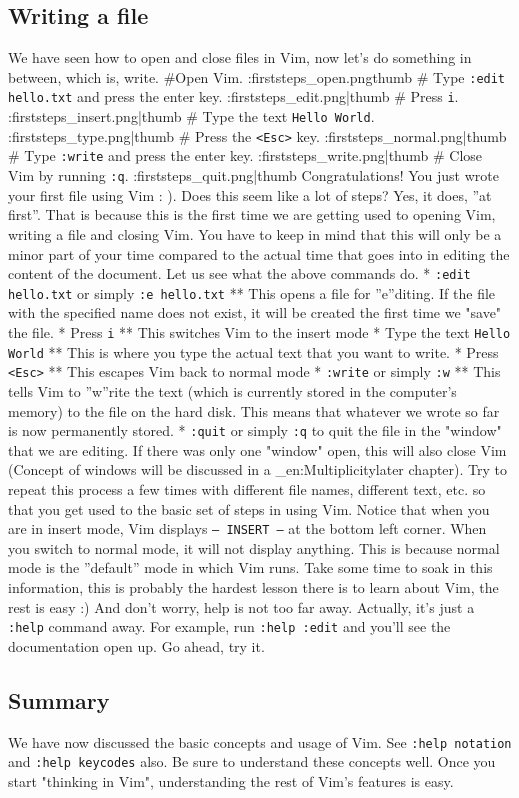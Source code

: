 \subsection{Writing a file} 
We have seen how to open and close files in Vim,
now let's do something in between, which is, write. 
\#Open Vim.  :firststeps\_open.pngthumb \# Type \texttt{:edit hello.txt} and press the enter
key. :firststeps\_edit.png|thumb \# Press \texttt{i}.
:firststeps\_insert.png|thumb \# Type the text \texttt{Hello World}.
:firststeps\_type.png|thumb \# Press the \texttt{<Esc>} key.
:firststeps\_normal.png|thumb \# Type \texttt{:write} and press the enter key.
:firststeps\_write.png|thumb \# Close Vim by running \texttt{:q}.
:firststeps\_quit.png|thumb Congratulations! You just wrote your first file
using Vim : ). Does this seem like a lot of steps? Yes, it does, ''at
first''. That is because this is the first time we are getting used to opening
Vim, writing a file and closing Vim. You have to keep in mind that this will
only be a minor part of your time compared to the actual time that goes into in
editing the content of the document. Let us see what the above commands do. *
\texttt{:edit hello.txt} or simply \texttt{:e hello.txt} ** This opens a file
for ''e''diting. If the file with the specified name does not exist, it will be
created the first time we "save" the file. * Press \texttt{i} ** This switches
Vim to the insert mode * Type the text \texttt{Hello World} ** This is where
you type the actual text that you want to write. * Press \texttt{<Esc>}
** This escapes Vim back to normal mode * \texttt{:write} or simply \texttt{:w}
** This tells Vim to ''w''rite the text (which is currently stored in the
computer's memory) to the file on the hard disk. This means that whatever we
wrote so far is now permanently stored. * \texttt{:quit} or simply \texttt{:q}
to quit the file in the "window" that we are editing. If there was only one
"window" open, this will also close Vim (Concept of windows will be discussed
in a \_en:Multiplicitylater chapter). Try to repeat this process a few times
with different file names, different text, etc. so that you get used to the
basic set of steps in using Vim. Notice that when you are in insert mode, Vim
displays \texttt{-- INSERT --} at the bottom left corner. When you switch to
normal mode, it will not display anything. This is because normal mode is the
''default'' mode in which Vim runs. Take some time to soak in this information,
this is probably the hardest lesson there is to learn about Vim, the rest is
easy :) And don't worry, help is not too far away. Actually, it's just a
\texttt{:help} command away. For example, run \texttt{:help :edit} and you'll
see the documentation open up. Go ahead, try it. 

\subsection{Summary} 
We have now discussed the basic concepts and usage of Vim. See \texttt{:help
notation} and \texttt{:help keycodes} also. Be sure to understand these
concepts well. Once you start "thinking in Vim", understanding the rest of
Vim's features is easy.
